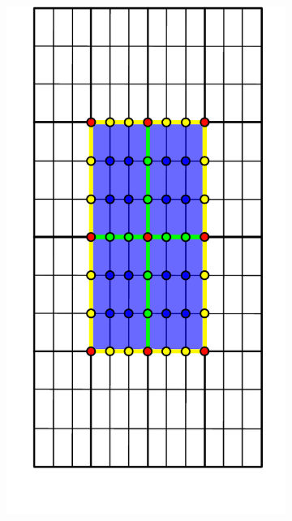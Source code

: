 \begin{figure} [htbp]
\begin{subfigure}[t]{0.22\textwidth}
  \centerline{\includegraphics[width=\linewidth]{figs/FE_12x12_b}}
  \caption{\label{fig:fem_demo_support}}
\end{subfigure}
\hfill
\begin{subfigure}[t]{0.22\textwidth}

\end{subfigure}
\end{figure}
